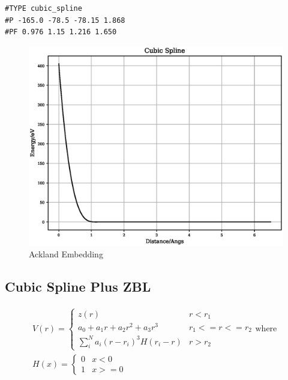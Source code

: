 \begin{lstlisting}[style=pseudocode,caption={Cubic Splines}]
#TYPE cubic_spline
#P -165.0 -78.5 -78.15 1.868
#PF 0.976 1.15 1.216 1.650
\end{lstlisting}

\FloatBarrier
\begin{figure}[h]
  \begin{center}
    \includegraphics[scale=0.5]{appendix/functions/plots/cubic_spline.eps}
    \caption{Ackland Embedding}
    \label{graph:graph1}
  \end{center}
\end{figure}
\FloatBarrier


\subsection{Cubic Spline Plus ZBL}

\begin{equation}
\begin{split}
V(r) = \left\{ \begin{matrix} z(r) & r <r_1 \\  a_0 + a_1 r + a_2 r^2 + a_3 r^3 & r_1 <= r <= r_2  \\   \sum_i^N a_i (r - r_i)^3 H(r_i - r) & r > r_2 \end{matrix} \right . 
\text{where } \\
H(x) = \left\{ \begin{matrix} 0 & x<0 \\  1 & x >= 0 \end{matrix} \right . 
\end{split}
\label{eq:cubicSplineZBL}
\end{equation}

